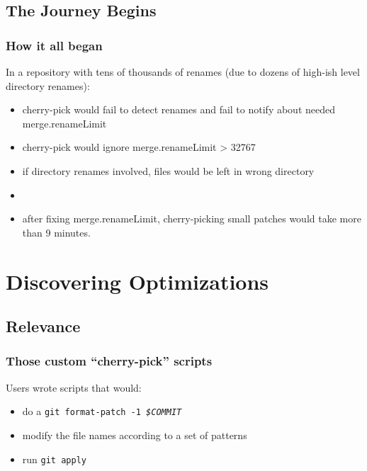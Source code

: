 \documentclass[compress,t]{beamer}
\begin{document}
\subsection{The Journey Begins}

\begin{frame}
  \frametitle{How it all began}

  In a repository with tens of thousands of renames (due to dozens of
  high-ish level directory renames):

  \begin{itemize}[<+(1)->]
    \item cherry-pick would fail to detect renames and fail to notify
          about needed merge.renameLimit
    \item cherry-pick would ignore merge.renameLimit > 32767
    \item if directory renames involved, files would be left in wrong
          directory
    \item {}
    \item after fixing merge.renameLimit, cherry-picking small patches
          would take more than 9 minutes.
  \end{itemize}

\end{frame}

\section{Discovering Optimizations}
\subsection{Relevance}

\begin{frame}
  \frametitle{Those custom ``cherry-pick'' scripts}

  Users wrote scripts that would:

  \begin{itemize}[<+(1)->]
    \item do a \texttt{git format-patch -1 \textit{\$COMMIT}}
    \item modify the file names according to a set of patterns
    \item run \texttt{git apply}
  \end{itemize}


\end{frame}
\end{document}
